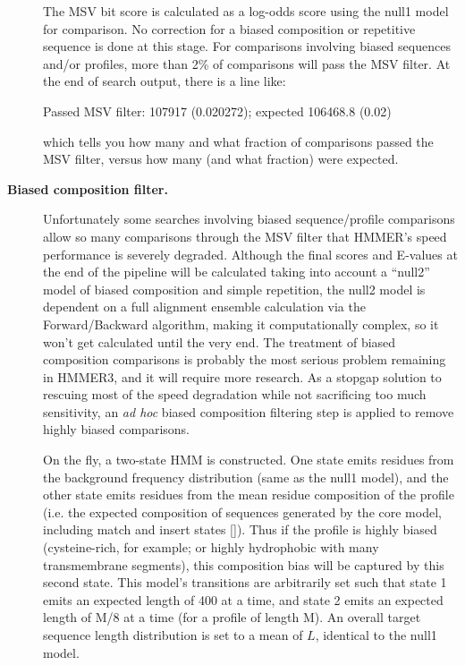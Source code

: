 \begin{description}
 The MSV bit score is calculated as a log-odds score using the null1
 model for comparison. No correction for a biased composition or
 repetitive sequence is done at this stage. For comparisons involving
 biased sequences and/or profiles, more than 2\% of comparisons will
 pass the MSV filter. At the end of search output, there is a line
 like:

\begin{sreoutput}
 Passed MSV filter:                    107917  (0.020272); expected 106468.8 (0.02)
\end{sreoutput}

 which tells you how many and what fraction of comparisons passed the
 MSV filter, versus how many (and what fraction) were expected. 

\item[\textbf{Biased composition filter.}]
 Unfortunately some searches involving biased sequence/profile
 comparisons allow so many comparisons through the MSV filter that
 HMMER's speed performance is severely degraded. Although the final
 scores and E-values at the end of the pipeline will be calculated
 taking into account a ``null2'' model of biased composition and
 simple repetition, the null2 model is dependent on a full alignment
 ensemble calculation via the Forward/Backward algorithm, making it
 computationally complex, so it won't get calculated until the very
 end. The treatment of biased composition comparisons is probably the
 most serious problem remaining in HMMER3, and it will require more
 research. As a stopgap solution to rescuing most of the speed
 degradation while not sacrificing too much sensitivity, an \emph{ad
   hoc} biased composition filtering step is applied to remove highly
 biased comparisons.

 On the fly, a two-state HMM is constructed. One state emits residues
 from the background frequency distribution (same as the null1 model),
 and the other state emits residues from the mean residue composition
 of the profile (i.e. the expected composition of sequences generated
 by the core model, including match and insert states
 []). Thus if the profile
 is highly biased (cysteine-rich, for example; or highly hydrophobic
 with many transmembrane segments), this composition bias will be
 captured by this second state. This model's transitions are
 arbitrarily set such that state 1 emits an expected length of 400 at
 a time, and state 2 emits an expected length of M/8 at a time (for a
 profile of length M). An overall target sequence length distribution
 is set to a mean of $L$, identical to the null1 model. 


\end{description}
